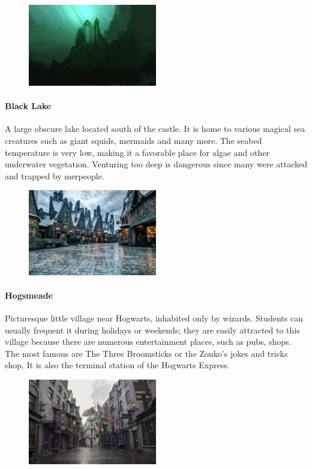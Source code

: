 \begin{figure}
\centering
\includegraphics[max width=0.5\textwidth]{../Pictures/Locations/Hogwarts/Black_Lake_picture.jpg} 
\end{figure}
\paragraph{Black Lake}
A large obscure lake located south of the castle. It is home to various magical sea creatures such as giant squids, mermaids and many more. The seabed temperature is very low, making it a favorable place for algae and other underwater vegetation. Venturing too deep is dangerous since many were attacked and trapped by merpeople.

\begin{figure}
\centering
\includegraphics[max width=0.5\textwidth]{../Pictures/Locations/Hogsmeade_picture.jpg} 
\end{figure}
\paragraph{Hogsmeade}
Picturesque little village near Hogwarts, inhabited only by wizards. Students can usually frequent it during holidays or weekends; they are easily attracted to this village because there are numerous entertainment places, such as pubs, shops. The most famous are The Three Broomsticks or the Zonko's jokes and tricks shop. It is also the terminal station of the Hogwarts Express. 

\begin{figure}
\centering
\includegraphics[max width=0.5\textwidth]{../Pictures/Locations/DiagonAlley_picture.jpg} 
\end{figure}
